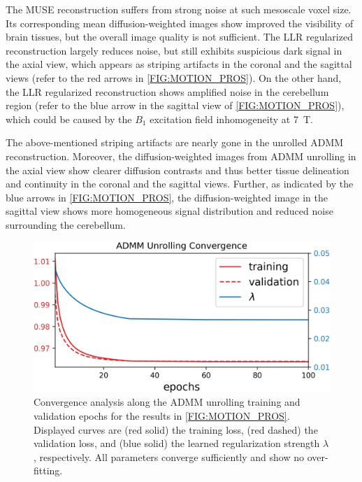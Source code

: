 \documentclass[journal,twoside,web]{ieeecolor}
\begin{document}
	The MUSE reconstruction suffers from strong noise
	at such mesoscale voxel size. 
	Its corresponding mean diffusion-weighted images show 
	improved the visibility of brain tissues, 
	but the overall image quality is not sufficient.
	The LLR regularized reconstruction largely reduces noise,
	but still exhibits suspicious dark signal in the axial view,
	which appears as striping artifacts in the coronal and the sagittal views
	(refer to the red arrows in \cref{FIG:MOTION_PROS}).
	On the other hand, the LLR regularized reconstruction
	shows amplified noise in the cerebellum region
	(refer to the blue arrow in the sagittal view of \cref{FIG:MOTION_PROS}),
	which could be caused by the $B_1$ excitation field inhomogeneity
	at \SI{7}{\tesla}.	

	The above-mentioned striping artifacts are nearly gone 
	in the unrolled ADMM reconstruction.
	Moreover, the diffusion-weighted images from ADMM unrolling in the axial view 
	show clearer diffusion contrasts 
	and thus better tissue delineation and continuity 
	in the coronal and the sagittal views.
	Further, as indicated by the blue arrows in \cref{FIG:MOTION_PROS},
	the diffusion-weighted image in the sagittal view shows more homogeneous
	signal distribution and reduced noise surrounding the cerebellum.

	\begin{figure}
		\centering
		\includegraphics[width=\columnwidth]{../figures/fig6.png}
		\caption{Convergence analysis along the ADMM unrolling training
			and validation epochs
			for the results in \cref{FIG:MOTION_PROS}.
			Displayed curves are (red solid) the training loss,
			(red dashed) the validation loss,
			and (blue solid) the learned regularization strength $\lambda$, respectively.
			All parameters converge sufficiently and show no over-fitting.}
		\label{FIG:CONVERGENCE}
	\end{figure}
\end{document}

